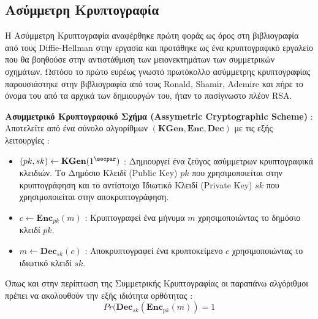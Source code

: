 \subsection{Ασύμμετρη Κρυπτογραφία}

Η Ασύμμετρη Κρυπτογραφία αναφέρθηκε πρώτη φοράς ως όρος στη βιβλιογραφία από τους Diffie-Hellman στην εργασία  και προτάθηκε ως ένα κρυπτογραφικό εργαλείο που θα βοηθούσε στην αντιστάθμιση των μειονεκτημάτων των συμμετρικών σχημάτων. Ωστόσο το πρώτο ευρέως γνωστό πρωτόκολλο ασύμμετρης κρυπτογραφίας παρουσιάστηκε στην βιβλιογραφία από τους Ronald, Shamir, Ademire και πήρε το όνομα του από τα αρχικά των δημιουργών του, ήταν το πασίγνωστο πλέον RSA. 

\begin{definition}
\textbf{Ασυμμετρικό Κρυπτογραφικό Σχήμα (Assymetric Cryptographic Scheme)} : Αποτελείτε από ένα σύνολο αλγορίθμων $(\textbf{KGen}, \textbf{Enc}, \textbf{Dec})$ με τις εξής λειτουργίες :
\begin{itemize}
    \item $(pk, sk) \leftarrow \textbf{KGen}(1^\secpar)$ : Δημιουργεί ένα ζεύγος ασύμμετρων κρυπτογραφικά κλειδιών. Το Δημόσιο Κλειδί (Public Key) $pk$ που χρησιμοποιείται στην κρυπτογράφηση και το αντίστοιχο Ιδιωτικό Κλειδί (Private Key) $sk$ που χρησιμοποιείται στην αποκρυπτογράφηση.
    \item $c \leftarrow \textbf{Enc}_{pk}(m)$ : Κρυπτογραφεί ένα μήνυμα $m$ χρησιμοποιώντας το δημόσιο κλειδί $pk$.
    \item $m \leftarrow \textbf{Dec}_{sk}(c)$ : Αποκρυπτογραφεί ένα κρυπτοκείμενο $c$ χρησιμοποιώντας το ιδιωτικό κλειδί $sk$.
\end{itemize}
Όπως και στην περίπτωση της Συμμετρικής Κρυπτογραφίας οι παραπάνω αλγόριθμοι πρέπει να ακολουθούν την εξής ιδιότητα ορθότητας :
$$
    Pr(\textbf{Dec}_{sk}(\textbf{Enc}_{pk}(m)) = 1
$$
\end{definition}


